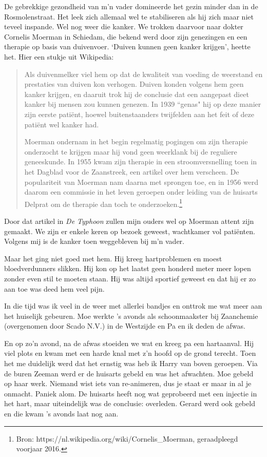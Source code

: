 \documentclass[10pt,twoside,openright]{memoir}
\begin{document}
De gebrekkige gezondheid van m’n vader domineerde het gezin minder dan in de Rosmolenstraat. Het leek zich allemaal wel te stabiliseren als hij zich maar niet teveel inspande. Wel nog weer die kanker. We trokken daarvoor naar dokter Cornelis Moerman in Schiedam, die bekend werd door zijn genezingen en een therapie op basis van duivenvoer. `Duiven kunnen geen kanker krijgen', heette het. Hier een stukje uit Wikipedia:

\begin{quote}
Als duivenmelker viel hem op dat de kwaliteit van voeding de weerstand en prestaties van duiven kon verhogen. Duiven konden volgens hem geen kanker krijgen, en daaruit trok hij de conclusie dat een aangepast dieet kanker bij mensen zou kunnen genezen. In 1939 ``genas" hij op deze manier zijn eerste patiënt, hoewel buitenstaanders twijfelden aan het feit of deze patiënt wel kanker had. 

Moerman ondernam in het begin regelmatig pogingen om zijn therapie onderzocht te krijgen maar hij vond geen weerklank bij de reguliere geneeskunde. In 1955 kwam zijn therapie in een stroomversnelling toen in het Dagblad voor de Zaanstreek,  een artikel over hem verscheen. De populariteit van Moerman nam daarna met sprongen toe, en in 1956 werd daarom een commissie in het leven geroepen onder leiding van de huisarts Delprat om de therapie dan toch te onderzoeken.\footnote{Bron: https://nl.wikipedia.org/wiki/Cornelis_Moerman, geraadpleegd voorjaar 2016.}
\end{quote}

Door dat artikel in \emph{De Typhoon} zullen mijn ouders wel op Moerman attent zijn gemaakt. We zijn er enkele keren op bezoek geweest, wachtkamer vol patiënten. Volgens mij is de kanker toen weggebleven bij m’n vader. 

Maar het ging niet goed met hem. Hij kreeg hartproblemen en moest bloedverdunners slikken. Hij kon op het laatst geen honderd meter meer lopen zonder even stil te moeten staan. Hij was altijd sportief geweest en dat hij er zo aan toe was deed hem veel pijn.

In die tijd was ik veel in de weer met allerlei bandjes en onttrok me wat meer aan het huiselijk gebeuren. Moe werkte ’s avonds als schoonmaakster bij Zaanchemie (overgenomen door Scado N.V.) in de Westzijde en Pa en ik deden de afwas. 

En op zo’n avond, na de afwas stoeiden we wat en kreeg pa een hartaanval. Hij viel plots en kwam met een harde knal met z’n hoofd op de grond terecht. Toen het me duidelijk werd dat het ernstig was heb ik Harry van boven geroepen. Via de buren Zeeman werd er de huisarts gebeld en was het afwachten. Moe gebeld op haar werk. Niemand wist iets van re-animeren, dus je staat er maar in al je onmacht. Paniek alom. De huisarts heeft nog wat geprobeerd met een injectie in het hart, maar uiteindelijk was de conclusie: overleden. Gerard werd ook gebeld en die kwam ’s avonds laat nog aan. 
\end{document}
